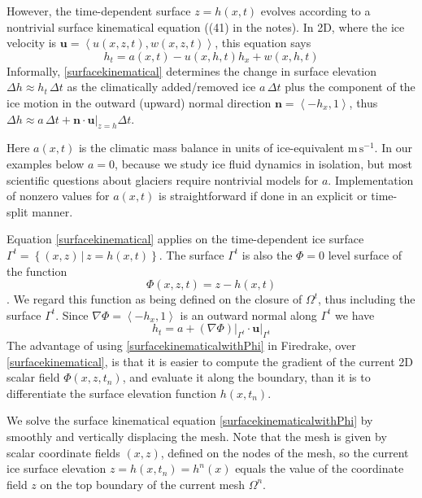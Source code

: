 \documentclass[letterpaper,final,12pt,reqno]{amsart}
\newcommand{\grad}{\nabla}
\newcommand{\bn}{\mathbf{n}}
\newcommand{\bu}{\mathbf{u}}
\begin{document}
However, the time-dependent surface $z=h(x,t)$ evolves according to a nontrivial surface kinematical equation ((41) in the notes).  In 2D, where the ice velocity is $\bu=\left<u(x,z,t),w(x,z,t)\right>$, this equation says
\begin{equation}
h_t = a(x,t) - u(x,h,t) h_x + w(x,h,t) \label{surfacekinematical}
\end{equation}
Informally, \eqref{surfacekinematical} determines the change in surface elevation $\Delta h \approx h_t\,\Delta t$ as the climatically added/removed ice $a\,\Delta t$ plus the component of the ice motion in the outward (upward) normal direction $\bn = \left<-h_x,1\right>$, thus $\Delta h \approx a \,\Delta t + \bn\cdot \bu\big|_{z=h} \Delta t$.

Here $a(x,t)$ is the climatic mass balance in units of ice-equivalent $\text{m}\,\text{s}^{-1}$.  In our examples below $a=0$, because we study ice fluid dynamics in isolation, but most scientific questions about glaciers require nontrivial models for $a$.  Implementation of nonzero values for $a(x,t)$ is straightforward if done in an explicit or time-split manner.

Equation \eqref{surfacekinematical} applies on the time-dependent ice surface $\Gamma^t = \left\{(x,z) \,\big|\, z = h(x,t)\right\}$.  The surface $\Gamma^t$ is also the $\Phi=0$ level surface of the function
    $$\Phi(x,z,t) = z - h(x,t)$$
\cite[pp.~65--66]{GreveBlatter2009}.  We regard this function as being defined on the closure of $\Omega^t$, thus including the surface $\Gamma^t$.  Since $\grad \Phi = \left<-h_x,1\right>$ is an outward normal along $\Gamma^t$ we have
\begin{equation}
h_t = a + (\grad \Phi)\big|_{\Gamma^t} \cdot \bu\big|_{\Gamma^t}  \label{surfacekinematicalwithPhi}
\end{equation}
The advantage of using \eqref{surfacekinematicalwithPhi} in Firedrake, over \eqref{surfacekinematical}, is that it is easier to compute the gradient of the current 2D scalar field $\Phi(x,z,t_n)$, and evaluate it along the boundary, than it is to differentiate the surface elevation function $h(x,t_n)$.

We solve the surface kinematical equation \eqref{surfacekinematicalwithPhi} by smoothly and vertically displacing the mesh.  Note that the mesh is given by scalar coordinate fields $(x,z)$, defined on the nodes of the mesh, so the current ice surface elevation $z=h(x,t_n)=h^n(x)$ equals the value of the coordinate field $z$ on the top boundary of the current mesh $\Omega^n$.
\end{document}

